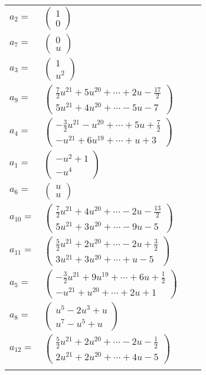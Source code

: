 \documentclass[1p]{elsarticle_modified}
\theoremstyle{definition}
\begin{document}
\begin{tabular}{m{7pt} m{180pt} m{7pt} m{180pt} }
\flushright $a_{2}=$&$\begin{pmatrix}1\\0\end{pmatrix}$ \\
\flushright $a_{7}=$&$\begin{pmatrix}0\\u\end{pmatrix}$ \\
\flushright $a_{3}=$&$\begin{pmatrix}1\\u^2\end{pmatrix}$ \\
\flushright $a_{9}=$&$\begin{pmatrix}\frac{7}{2} u^{21}+5 u^{20}+\cdots+2 u-\frac{17}{2}\\5 u^{21}+4 u^{20}+\cdots-5 u-7\end{pmatrix}$ \\
\flushright $a_{4}=$&$\begin{pmatrix}-\frac{3}{2} u^{21}- u^{20}+\cdots+5 u+\frac{7}{2}\\- u^{21}+6 u^{19}+\cdots+u+3\end{pmatrix}$ \\
\flushright $a_{1}=$&$\begin{pmatrix}- u^2+1\\- u^4\end{pmatrix}$ \\
\flushright $a_{6}=$&$\begin{pmatrix}u\\u\end{pmatrix}$ \\
\flushright $a_{10}=$&$\begin{pmatrix}\frac{7}{2} u^{21}+4 u^{20}+\cdots-2 u-\frac{13}{2}\\5 u^{21}+3 u^{20}+\cdots-9 u-5\end{pmatrix}$ \\
\flushright $a_{11}=$&$\begin{pmatrix}\frac{5}{2} u^{21}+2 u^{20}+\cdots-2 u+\frac{3}{2}\\3 u^{21}+3 u^{20}+\cdots+u-5\end{pmatrix}$ \\
\flushright $a_{5}=$&$\begin{pmatrix}-\frac{3}{2} u^{21}+9 u^{19}+\cdots+6 u+\frac{1}{2}\\- u^{21}+u^{20}+\cdots+2 u+1\end{pmatrix}$ \\
\flushright $a_{8}=$&$\begin{pmatrix}u^5-2 u^3+u\\u^7- u^5+u\end{pmatrix}$ \\
\flushright $a_{12}=$&$\begin{pmatrix}\frac{5}{2} u^{21}+2 u^{20}+\cdots-2 u-\frac{1}{2}\\2 u^{21}+2 u^{20}+\cdots+4 u-5\end{pmatrix}$\\&\end{tabular}
\end{document}
